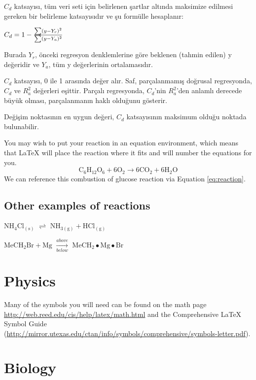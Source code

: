 \documentclass[12pt,twoside]{deuthesis}
\begin{document}
\(C_{d}\) katsayısı, tüm veri seti için belirlenen şartlar altında maksimize edilmesi gereken bir belirleme katsayısıdır ve şu formülle hesaplanır:

\(C_{d}=1-{\sum (y-Y_{r})^{2} \over \sum (y-Y_{a})^{2}}\)

Burada \(Y_{r}\), önceki regresyon denklemlerine göre beklenen (tahmin edilen) y değeridir ve \(Y_{a}\), tüm y değerlerinin ortalamasıdır.

\(C_{d}\) katsayısı, 0 ile 1 arasında değer alır. Saf, parçalanmamış doğrusal regresyonda, \(C_{d}\) ve \(R_{a}^2\) değerleri eşittir. Parçalı regresyonda, \(C_{d}\)'nin \(R_{a}^2\)'den anlamlı derecede büyük olması, parçalanmanın haklı olduğunu gösterir.

Değişim noktasının en uygun değeri, \(C_{d}\) katsayısının maksimum olduğu noktada bulunabilir.

You may wish to put your reaction in an equation environment, which means that LaTeX will place the reaction where it fits and will number the equations for you.
\begin{equation}
  \mathrm{C_6H_{12}O_6  + 6O_2} \longrightarrow \mathrm{6CO_2 + 6H_2O}
  \label{eq:reaction}
\end{equation}
We can reference this combustion of glucose reaction via Equation \eqref{eq:reaction}.

\hypertarget{other-examples-of-reactions}{%
\subsection{Other examples of reactions}\label{other-examples-of-reactions}}

\(\mathrm{NH_4Cl_{(s)}}\) \(\rightleftharpoons\) \(\mathrm{NH_{3(g)}+HCl_{(g)}}\)

\noindent \(\mathrm{MeCH_2Br + Mg}\) \(\xrightarrow[below]{above}\) \(\mathrm{MeCH_2\bullet Mg \bullet Br}\)

\hypertarget{physics}{%
\section{Physics}\label{physics}}

Many of the symbols you will need can be found on the math page \url{http://web.reed.edu/cis/help/latex/math.html} and the Comprehensive LaTeX Symbol Guide (\url{http://mirror.utexas.edu/ctan/info/symbols/comprehensive/symbols-letter.pdf}).

\hypertarget{biology}{%
\section{Biology}\label{biology}}
\end{document}
